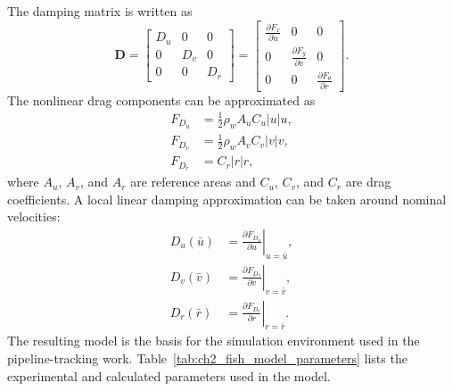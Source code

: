 \documentclass{uhcoethesis}
\begin{document}
The damping matrix is written as
\begin{equation}
    \mathbf{D} =
    \begin{bmatrix}
        D_u & 0 & 0 \\
        0 & D_v & 0 \\
        0 & 0 & D_r
    \end{bmatrix}
    =
    \begin{bmatrix}
        \frac{\partial F_x}{\partial u} & 0 & 0 \\
        0 & \frac{\partial F_y}{\partial v} & 0 \\
        0 & 0 & \frac{\partial F_{\theta}}{\partial r}
    \end{bmatrix}.
    \label{eq:ch2_damping_matrix}
\end{equation}
The nonlinear drag components can be approximated as
\begin{equation}
    \begin{aligned}
        F_{D_u} &= \frac{1}{2}\rho_w A_u C_u |u|u, \\
        F_{D_v} &= \frac{1}{2}\rho_w A_v C_v |v|v, \\
        F_{D_r} &= C_r |r|r,
    \end{aligned}
    \label{eq:ch2_drag_forces}
\end{equation}
where $A_u$, $A_v$, and $A_r$ are reference areas and $C_u$, $C_v$, and $C_r$ are drag coefficients. A local linear damping approximation can be taken around nominal velocities:
\begin{equation}
    \begin{aligned}
        D_u(\bar{u}) &=
        \left.\frac{\partial F_{D_u}}{\partial u}\right|_{u=\bar{u}}, \\
        D_v(\bar{v}) &=
        \left.\frac{\partial F_{D_v}}{\partial v}\right|_{v=\bar{v}}, \\
        D_r(\bar{r}) &=
        \left.\frac{\partial F_{D_r}}{\partial r}\right|_{r=\bar{r}}.
    \end{aligned}
    \label{eq:ch2_linear_damping}
\end{equation}
The resulting model is the basis for the simulation environment used in the pipeline-tracking work. Table~\ref{tab:ch2_fish_model_parameters} lists the experimental and calculated parameters used in the model.
\end{document}
